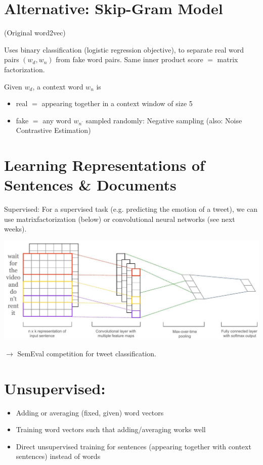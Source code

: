\documentclass[10pt]{article}
\begin{document}
\section*{Alternative: Skip-Gram Model}
(Original word2vec)

Uses binary classification (logistic regression objective), to separate real word pairs $\left(w_{d}, w_{n}\right)$ from fake word pairs. Same inner product score $=$ matrix factorization.

Given $w_{d}$, a context word $w_{n}$ is

\begin{itemize}
  \item real $=$ appearing together in a context window of size 5
  \item fake $=$ any word $w_{n^{\prime}}$ sampled randomly: Negative sampling (also: Noise Contrastive Estimation)
\end{itemize}

\section*{Learning Representations of Sentences \& Documents}
Supervised: For a supervised task (e.g. predicting the emotion of a tweet), we can use matrixfactorization (below) or convolutional neural networks (see next weeks).

\begin{center}
\includegraphics[max width=\textwidth]{2023_12_29_a68c38042b8470fb184bg-08}
\end{center}

$\rightarrow$ SemEval competition for tweet classification.

\section*{Unsupervised:}
\begin{itemize}
  \item Adding or averaging (fixed, given) word vectors
  \item Training word vectors such that adding/averaging works well
  \item Direct unsupervised training for sentences (appearing together with context sentences) instead of words
\end{itemize}
\end{document}
